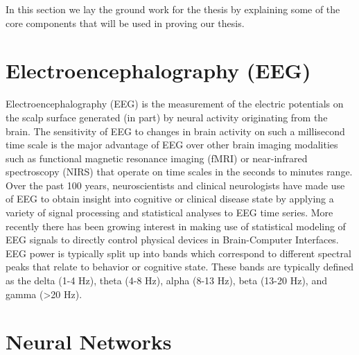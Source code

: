 \documentclass[12pt,a4paper,titlepage,openany]{report}
\begin{document}
In this section we lay the ground work for the thesis by explaining some of the core components that will be used in proving our thesis.

\section{Electroencephalography (EEG)}

Electroencephalography (EEG) is the measurement of the electric potentials on the scalp surface generated (in part) by neural activity originating from the brain. 
The sensitivity of EEG to changes in brain activity on such a millisecond time scale is the major advantage of EEG over other brain imaging modalities such as functional magnetic resonance imaging (fMRI) or near-infrared spectroscopy (NIRS) that operate on time scales in the seconds to minutes range. 
Over the past 100 years, neuroscientists and clinical neurologists have made use of EEG to obtain insight into cognitive or clinical disease state by applying a variety of signal processing and statistical analyses to EEG time series. 
More recently there has been growing interest in making use of statistical modeling of EEG signals to directly control physical devices in Brain-Computer Interfaces.
EEG power is typically split up into bands which correspond to different spectral peaks that relate to behavior or cognitive state. These bands are typically defined as the delta (1-4 Hz), theta (4-8 Hz), alpha (8-13 Hz), beta (13-20 Hz), and gamma (\textgreater 20 Hz).\cite{nunez2016}

\section{Neural Networks}
\end{document}

